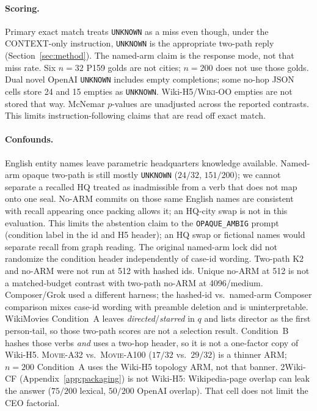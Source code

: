 \documentclass{article}
\begin{document}
\paragraph{Scoring.}
Primary exact match treats \texttt{UNKNOWN} as a miss even though, under
the CONTEXT-only instruction, \texttt{UNKNOWN} is the appropriate
two-path reply (Section~\ref{sec:method}).
The named-arm claim is the response mode, not that miss rate.
Six $n{=}32$ P159 golds are not cities; $n{=}200$ does not use those golds.
Dual novel OpenAI \texttt{UNKNOWN} includes empty completions; some no-hop
JSON cells store 24 and 15 empties as \texttt{UNKNOWN}.
Wiki-H5/\textsc{Wiki-OO} empties are not stored that way.
McNemar $p$-values are unadjusted across the reported contrasts.
This limits instruction-following claims that are read off exact match.

\paragraph{Confounds.}
English entity names leave parametric headquarters knowledge available.
Named-arm opaque two-path is still mostly \texttt{UNKNOWN}
($24/32$, $151/200$); we cannot separate a recalled HQ treated as
inadmissible from a verb that does not map onto one seal.
No-ARM commits on those same English names are consistent with recall
appearing once packing allows it; an HQ-city swap is not in this
evaluation.
This limits the abstention claim to the \texttt{OPAQUE\_AMBIG} prompt
(condition label in the id and H5 header); an HQ swap or
fictional names would separate recall from graph reading.
The original named-arm lock did not randomize the condition header
independently of case-id wording.
Two-path K2 and no-ARM were not run at 512 with hashed ids.
Unique no-ARM at 512 is not a matched-budget contrast with two-path
no-ARM at 4096/medium.
Composer/Grok used a different harness; the hashed-id vs.\ named-arm
Composer comparison mixes case-id wording with preamble deletion and is
uninterpretable.
WikiMovies Condition~A leaves \emph{directed}/\emph{starred} in $q$ and
lists director as the first person-tail, so those two-path scores are not
a selection result.
Condition~B hashes those verbs \emph{and} uses a two-hop header, so it is
not a one-factor copy of Wiki-H5.
\textsc{Movie-A32} vs.\ \textsc{Movie-A100} ($17/32$ vs.\ $29/32$) is a
thinner ARM; $n{=}200$ Condition~A uses the Wiki-H5 topology ARM, not
that banner.
2Wiki-CF (Appendix~\ref{app:packaging}) is not Wiki-H5: Wikipedia-page
overlap can leak the answer ($75/200$ lexical, $50/200$ OpenAI overlap).
That cell does not limit the CEO factorial.
\end{document}
